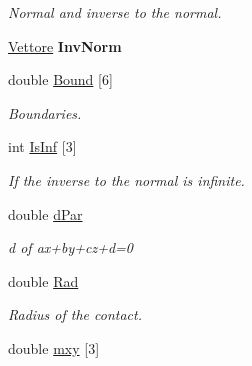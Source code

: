 \begin{DoxyCompactItemize}
\begin{DoxyCompactList}\small\item\em Normal and inverse to the normal. \end{DoxyCompactList}\item 
\hyperlink{classVettore}{Vettore} {\bfseries Inv\+Norm}\hypertarget{classPiano_aa4d08f1fb27cc9a543a1284307a7056e}{}\label{classPiano_aa4d08f1fb27cc9a543a1284307a7056e}

\item 
double \hyperlink{classPiano_a0f41faab69f9c65dfd0fb1be94a39e98}{Bound} \mbox{[}6\mbox{]}\hypertarget{classPiano_a0f41faab69f9c65dfd0fb1be94a39e98}{}\label{classPiano_a0f41faab69f9c65dfd0fb1be94a39e98}

\begin{DoxyCompactList}\small\item\em Boundaries. \end{DoxyCompactList}\item 
int \hyperlink{classPiano_a1674748957dda21006ad123fdd340ae5}{Is\+Inf} \mbox{[}3\mbox{]}\hypertarget{classPiano_a1674748957dda21006ad123fdd340ae5}{}\label{classPiano_a1674748957dda21006ad123fdd340ae5}

\begin{DoxyCompactList}\small\item\em If the inverse to the normal is infinite. \end{DoxyCompactList}\item 
double \hyperlink{classPiano_a572f508f165c489a801e9952b2147404}{d\+Par}\hypertarget{classPiano_a572f508f165c489a801e9952b2147404}{}\label{classPiano_a572f508f165c489a801e9952b2147404}

\begin{DoxyCompactList}\small\item\em d of ax+by+cz+d=0 \end{DoxyCompactList}\item 
double \hyperlink{classPiano_a860bef50013f57ab1a6437b7986a9487}{Rad}\hypertarget{classPiano_a860bef50013f57ab1a6437b7986a9487}{}\label{classPiano_a860bef50013f57ab1a6437b7986a9487}

\begin{DoxyCompactList}\small\item\em Radius of the contact. \end{DoxyCompactList}\item 
double \hyperlink{classPiano_adad63c5605eb5e3c78e5a256458a6db9}{mxy} \mbox{[}3\mbox{]}\hypertarget{classPiano_adad63c5605eb5e3c78e5a256458a6db9}{}\label{classPiano_adad63c5605eb5e3c78e5a256458a6db9}


\end{DoxyCompactItemize}
